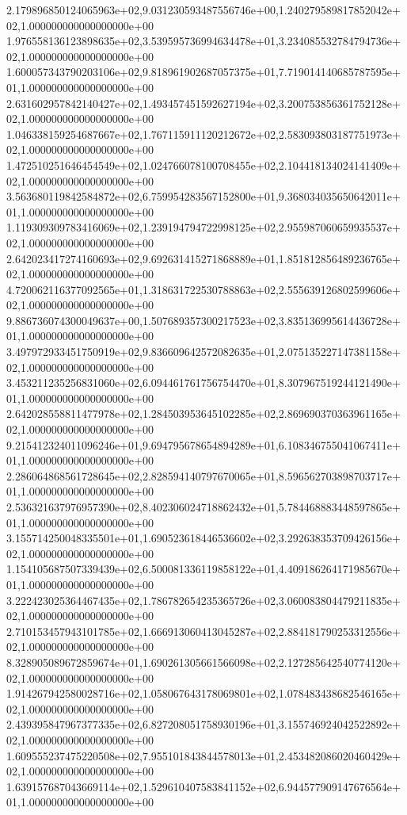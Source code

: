 2.179896850124065963e+02,9.031230593487556746e+00,1.240279589817852042e+02,1.000000000000000000e+00
1.976558136123898635e+02,3.539595736994634478e+01,3.234085532784794736e+02,1.000000000000000000e+00
1.600057343790203106e+02,9.818961902687057375e+01,7.719014140685787595e+01,1.000000000000000000e+00
2.631602957842140427e+02,1.493457451592627194e+02,3.200753856361752128e+02,1.000000000000000000e+00
1.046338159254687667e+02,1.767115911120212672e+02,2.583093803187751973e+02,1.000000000000000000e+00
1.472510251646454549e+02,1.024766078100708455e+02,2.104418134024141409e+02,1.000000000000000000e+00
3.563680119842584872e+02,6.759954283567152800e+01,9.368034035650642011e+01,1.000000000000000000e+00
1.119309309783416069e+02,1.239194794722998125e+02,2.955987060659935537e+02,1.000000000000000000e+00
2.642023417274160693e+02,9.692631415271868889e+01,1.851812856489236765e+02,1.000000000000000000e+00
4.720062116377092565e+01,1.318631722530788863e+02,2.555639126802599606e+02,1.000000000000000000e+00
9.886736074300049637e+00,1.507689357300217523e+02,3.835136995614436728e+01,1.000000000000000000e+00
3.497972933451750919e+02,9.836609642572082635e+01,2.075135227147381158e+02,1.000000000000000000e+00
3.453211235256831060e+02,6.094461761756754470e+01,8.307967519244121490e+01,1.000000000000000000e+00
2.642028558811477978e+02,1.284503953645102285e+02,2.869690370363961165e+02,1.000000000000000000e+00
9.215412324011096246e+01,9.694795678654894289e+01,6.108346755041067411e+01,1.000000000000000000e+00
2.286064868561728645e+02,2.828594140797670065e+01,8.596562703898703717e+01,1.000000000000000000e+00
2.536321637976957390e+02,8.402306024718862432e+01,5.784468883448597865e+01,1.000000000000000000e+00
3.155714250048335501e+01,1.690523618446536602e+02,3.292638353709426156e+02,1.000000000000000000e+00
1.154105687507339439e+02,6.500081336119858122e+01,4.409186264171985670e+01,1.000000000000000000e+00
3.222423025364467435e+02,1.786782654235365726e+02,3.060083804479211835e+02,1.000000000000000000e+00
2.710153457943101785e+02,1.666913060413045287e+02,2.884181790253312556e+02,1.000000000000000000e+00
8.328905089672859674e+01,1.690261305661566098e+02,2.127285642540774120e+02,1.000000000000000000e+00
1.914267942580028716e+02,1.058067643178069801e+02,1.078483438682546165e+02,1.000000000000000000e+00
2.439395847967377335e+02,6.827208051758930196e+01,3.155746924042522892e+02,1.000000000000000000e+00
1.609555237475220508e+02,7.955101843844578013e+01,2.453482086020460429e+02,1.000000000000000000e+00
1.639157687043669114e+02,1.529610407583841152e+02,6.944577909147676564e+01,1.000000000000000000e+00
